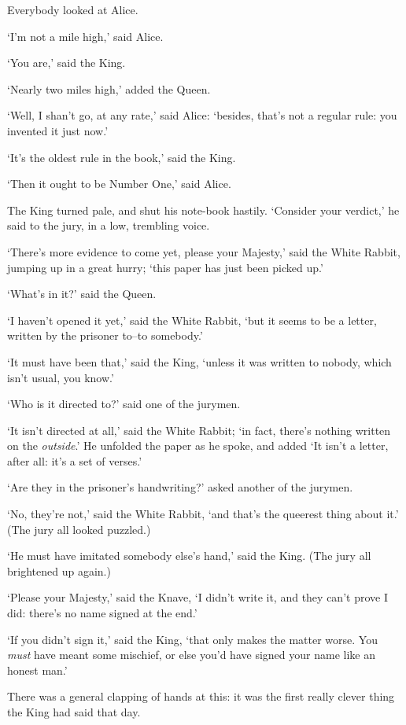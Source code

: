   Everybody looked at Alice.

  `I'm not a mile high,' said Alice.

  `You are,' said the King.

  `Nearly two miles high,' added the Queen.

  `Well, I shan't go, at any rate,' said Alice:  `besides,
that's not a regular rule:  you invented it just now.'

  `It's the oldest rule in the book,' said the King.

  `Then it ought to be Number One,' said Alice.

  The King turned pale, and shut his note-book hastily.
`Consider your verdict,' he said to the jury, in a low, trembling
voice.

  `There's more evidence to come yet, please your Majesty,' said
the White Rabbit, jumping up in a great hurry; `this paper has
just been picked up.'

  `What's in it?' said the Queen.

  `I haven't opened it yet,' said the White Rabbit, `but it seems
to be a letter, written by the prisoner to--to somebody.'

  `It must have been that,' said the King, `unless it was
written to nobody, which isn't usual, you know.'

  `Who is it directed to?' said one of the jurymen.

  `It isn't directed at all,' said the White Rabbit; `in fact,
there's nothing written on the {\it outside}.'  He unfolded the paper
as he spoke, and added `It isn't a letter, after all:  it's a set
of verses.'

  `Are they in the prisoner's handwriting?' asked another of
the jurymen.

  `No, they're not,' said the White Rabbit, `and that's the
queerest thing about it.'  (The jury all looked puzzled.)

  `He must have imitated somebody else's hand,' said the King.
(The jury all brightened up again.)

  `Please your Majesty,' said the Knave, `I didn't write it, and
they can't prove I did:  there's no name signed at the end.'

  `If you didn't sign it,' said the King, `that only makes the
matter worse.  You {\it must} have meant some mischief, or else you'd
have signed your name like an honest man.'

  There was a general clapping of hands at this:  it was the
first really clever thing the King had said that day.

